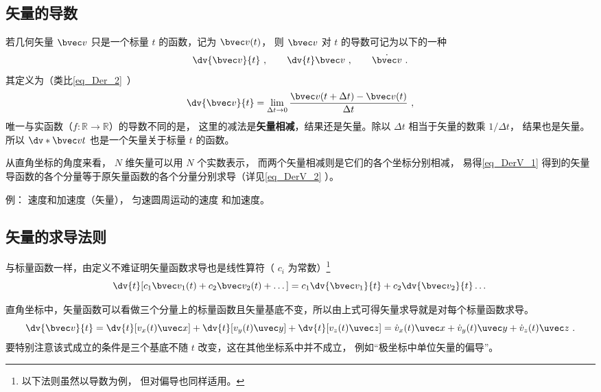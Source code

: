 
\begin{issues}
\end{issues}



\subsection{矢量的导数}

若几何矢量 $\bvec v$ 只是一个标量 $t$ 的函数，记为 $\bvec v(t)$， 则 $\bvec v$ 对 $t$ 的导数可记为以下的一种
\begin{equation}
\dv{\bvec v}{t}~, \qquad \dv{t}\bvec v~, \qquad \dot{\bvec v}~.
\end{equation}
其定义为（类比\autoref{eq_Der_2}~）
\begin{equation}\label{eq_DerV_1}
\dv{\bvec v}{t} = \lim_{\Delta t \to 0} \frac{\bvec v ( t + \Delta t) - \bvec v(t)}{\Delta t}~,
\end{equation}
唯一与实函数（$f:\mathbb R \to \mathbb R$）的导数不同的是， 这里的减法是\textbf{矢量相减}，结果还是矢量。除以 $\Delta t$ 相当于矢量的数乘 $1/\Delta t$， 结果也是矢量。 所以 $\dv*{\bvec v}{t}$ 也是一个矢量关于标量 $t$ 的函数。

从直角坐标的角度来看， $N$ 维矢量可以用 $N$ 个实数表示， 而两个矢量相减则是它们的各个坐标分别相减， 易得\autoref{eq_DerV_1} 得到的矢量导函数的各个分量等于原矢量函数的各个分量分别求导（详见\autoref{eq_DerV_2} ）。

例： 速度和加速度（矢量）， 匀速圆周运动的速度 和加速度。

\subsection{矢量的求导法则}
与标量函数一样，由定义不难证明矢量函数求导也是线性算符（ $c_i$ 为常数）\footnote{以下法则虽然以导数为例， 但对偏导也同样适用。}
\begin{equation}
\dv{t}[c_1 \bvec v_1(t) + c_2 \bvec v_2(t) + \dots] = c_1\dv{\bvec v_1}{t} + c_2\dv{\bvec v_2}{t} \dots
\end{equation}

直角坐标中，矢量函数可以看做三个分量上的标量函数且矢量基底不变，所以由上式可得矢量求导就是对每个标量函数求导。
\begin{equation}\label{eq_DerV_2}
\dv{\bvec v}{t} = \dv{t}[v_x(t)\uvec x] + \dv{t}[v_y(t)\uvec y] + \dv{t}[v_z(t)\uvec z]
= \dot v_x(t)\uvec x + \dot v_y(t)\uvec y + \dot v_z(t)\uvec z~.
\end{equation}
要特别注意该式成立的条件是三个基底不随 $t$ 改变，这在其他坐标系中并不成立， 例如“极坐标中单位矢量的偏导”。


